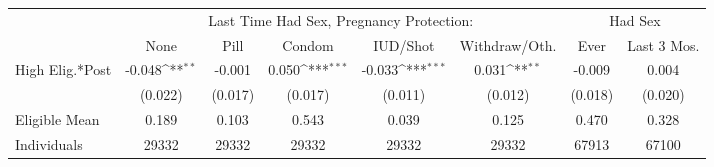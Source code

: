 {
\def\sym#1{\ifmmode^{#1}\else\(^{#1}\)\fi}
\begin{tabular}{l*{7}{c}}
\hline\hline
                    &\multicolumn{5}{c}{Last Time Had Sex, Pregnancy Protection:}                                                 &\multicolumn{2}{c}{Had Sex}                \\\cmidrule(lr){2-6}\cmidrule(lr){7-8}
                    &\multicolumn{1}{c}{None}&\multicolumn{1}{c}{Pill}&\multicolumn{1}{c}{Condom}&\multicolumn{1}{c}{IUD/Shot}&\multicolumn{1}{c}{Withdraw/Oth.}&\multicolumn{1}{c}{Ever}&\multicolumn{1}{c}{Last 3 Mos.}\\
\hline
High Elig.*Post     &      -0.048\sym{**} &      -0.001         &       0.050\sym{***}&      -0.033\sym{***}&       0.031\sym{**} &      -0.009         &       0.004         \\
                    &     (0.022)         &     (0.017)         &     (0.017)         &     (0.011)         &     (0.012)         &     (0.018)         &     (0.020)         \\
\hline
Eligible Mean       &       0.189         &       0.103         &       0.543         &       0.039         &       0.125         &       0.470         &       0.328         \\
Individuals         &       29332         &       29332         &       29332         &       29332         &       29332         &       67913         &       67100         \\
\hline\hline
\end{tabular}
}
